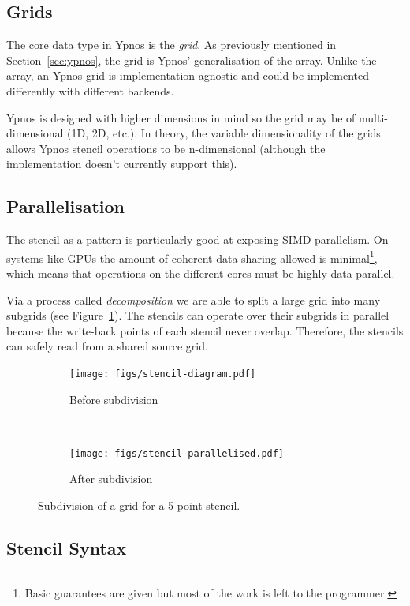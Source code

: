 \documentclass[
    12pt,
    a4paper,
    twoside,
    openright,
    ]{scrbook}
\begin{document}
\subsection{Grids}

The core data type in Ypnos is the \emph{grid}. As previously mentioned in
Section~\ref{sec:ypnos}, the grid is Ypnos' generalisation of the array. Unlike
the array, an Ypnos grid is implementation agnostic and could be implemented
differently with different backends.

Ypnos is designed with higher dimensions in mind so the grid may be of
multi-dimensional (1D, 2D, etc.). In theory, the variable dimensionality of the
grids allows Ypnos stencil operations to be n-dimensional (although the
implementation doesn't currently support this).

\subsection{Parallelisation}

The stencil as a pattern is particularly good at exposing SIMD parallelism. On
systems like GPUs the amount of coherent data sharing allowed is
minimal\footnote{Basic guarantees are given but most of the work is left to the
  programmer.}, which means that operations on the different cores
must be highly data parallel.

Via a process called \emph{decomposition} we are able to split a large grid into
many subgrids (see Figure~\ref{fig:sten-decomp}). The stencils can operate over
their subgrids in parallel because the write-back points of each stencil never
overlap. Therefore, the stencils can safely read from a shared source grid.

\begin{figure}[h]
\centering
\begin{subfigure}{0.45\textwidth}
\centering
\texttt{[image: figs/stencil-diagram.pdf]}
\caption{Before subdivision}
\end{subfigure}
~
\begin{subfigure}{0.45\textwidth}
\centering
\texttt{[image: figs/stencil-parallelised.pdf]}
\caption{After subdivision}
\end{subfigure}
\caption{Subdivision of a grid for a 5-point stencil.}
\label{fig:sten-decomp}
\end{figure}

\subsection{Stencil Syntax}
\end{document}
